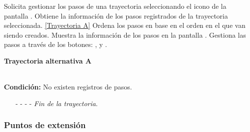 \begin{UCtrayectoria}
	\UCpaso[\UCactor] Solicita gestionar los pasos de una trayectoria seleccionando el icono  de la pantalla .
	\UCpaso[\UCsist] Obtiene la información de los pasos registrados de la trayectoria seleccionada. \hyperlink{CU12-1-1-1-1:TAA}{[Trayectoria A]}
	\UCpaso[\UCsist] Ordena los pasos en base en el orden en el que van siendo creados.
	\UCpaso[\UCsist] Muestra la información de los pasos en la pantalla . \label{CU12-1-1-1-1-P4}
	\UCpaso[\UCactor] Gestiona las pasos a través de los botones: , \editar y \eliminar. 
\end{UCtrayectoria}		
\hypertarget{CU12-1-1-1-1:TAA}{\textbf{Trayectoria alternativa A}}\\
\noindent \textbf{Condición:} No existen registros de pasos.
\begin{enumerate}
	\UCpaso[\UCsist] Muestra el mensaje  en la pantalla  para indicar que no hay registros de pasos para mostrar.  \label{CU12-1-1-1-1-TA1}
	\UCpaso[\UCactor] Gestiona las pasos a través del botón: . 
	\item[- -] - - {\em {Fin de la trayectoria}}.%
\end{enumerate}
\subsubsection{Puntos de extensión}

